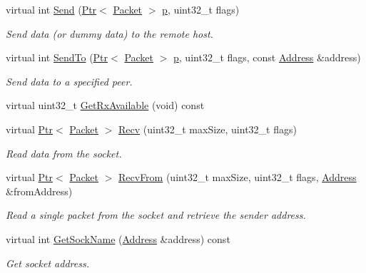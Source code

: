 \begin{DoxyCompactItemize}
virtual int \hyperlink{classns3_1_1UdpSocketImpl_ac8e23c2e48d59b943ad5beda3c9b9cce}{Send} (\hyperlink{classns3_1_1Ptr}{Ptr}$<$ \hyperlink{classns3_1_1Packet}{Packet} $>$ \hyperlink{lte__link__budget__x2__handover__measures_8m_ac9de518908a968428863f829398a4e62}{p}, uint32\+\_\+t flags)
\begin{DoxyCompactList}\small\item\em Send data (or dummy data) to the remote host. \end{DoxyCompactList}\item 
virtual int \hyperlink{classns3_1_1UdpSocketImpl_a8157d2ad72321be1047493ebf97e55f5}{Send\+To} (\hyperlink{classns3_1_1Ptr}{Ptr}$<$ \hyperlink{classns3_1_1Packet}{Packet} $>$ \hyperlink{lte__link__budget__x2__handover__measures_8m_ac9de518908a968428863f829398a4e62}{p}, uint32\+\_\+t flags, const \hyperlink{classns3_1_1Address}{Address} \&address)
\begin{DoxyCompactList}\small\item\em Send data to a specified peer. \end{DoxyCompactList}\item 
virtual uint32\+\_\+t \hyperlink{classns3_1_1UdpSocketImpl_a1a6d616624492e2846516de890832f63}{Get\+Rx\+Available} (void) const 
\item 
virtual \hyperlink{classns3_1_1Ptr}{Ptr}$<$ \hyperlink{classns3_1_1Packet}{Packet} $>$ \hyperlink{classns3_1_1UdpSocketImpl_a7268e7d9604b790bf455a2d0e664eac1}{Recv} (uint32\+\_\+t max\+Size, uint32\+\_\+t flags)
\begin{DoxyCompactList}\small\item\em Read data from the socket. \end{DoxyCompactList}\item 
virtual \hyperlink{classns3_1_1Ptr}{Ptr}$<$ \hyperlink{classns3_1_1Packet}{Packet} $>$ \hyperlink{classns3_1_1UdpSocketImpl_a5e460efb45eaf5fab145970043614ec8}{Recv\+From} (uint32\+\_\+t max\+Size, uint32\+\_\+t flags, \hyperlink{classns3_1_1Address}{Address} \&from\+Address)
\begin{DoxyCompactList}\small\item\em Read a single packet from the socket and retrieve the sender address. \end{DoxyCompactList}\item 
virtual int \hyperlink{classns3_1_1UdpSocketImpl_a871428d5daa26d9f0b3566c8310e9769}{Get\+Sock\+Name} (\hyperlink{classns3_1_1Address}{Address} \&address) const 
\begin{DoxyCompactList}\small\item\em Get socket address. \end{DoxyCompactList}\item 

\end{DoxyCompactItemize}
